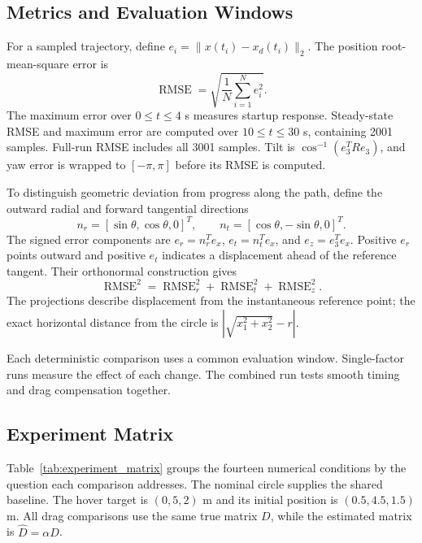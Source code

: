 \documentclass[letterpaper,10pt,conference]{ieeeconf}
\newcommand{\RMSE}{\operatorname{RMSE}}
\begin{document}
\subsection{Metrics and Evaluation Windows}
For a sampled trajectory, define $e_i=\|x(t_i)-x_d(t_i)\|_2$. The position root-mean-square error is
\begin{equation}
\RMSE=\sqrt{\frac1N\sum_{i=1}^N e_i^2}.
\end{equation}
The maximum error over $0\le t\le4$ s measures startup response. Steady-state RMSE and maximum error are computed over $10\le t\le30$ s, containing 2001 samples. Full-run RMSE includes all 3001 samples. Tilt is $\cos^{-1}(e_3^TRe_3)$, and yaw error is wrapped to $[-\pi,\pi]$ before its RMSE is computed.

To distinguish geometric deviation from progress along the path, define the outward radial and forward tangential directions
\begin{equation}
n_r=[\sin\theta,\cos\theta,0]^T,\qquad
n_t=[\cos\theta,-\sin\theta,0]^T.
\end{equation}
The signed error components are $e_r=n_r^Te_x$, $e_t=n_t^Te_x$, and $e_z=e_3^Te_x$. Positive $e_r$ points outward and positive $e_t$ indicates a displacement ahead of the reference tangent. Their orthonormal construction gives
\begin{equation}
\RMSE^2=\RMSE_r^2+\RMSE_t^2+\RMSE_z^2.
\label{eq:components}
\end{equation}
The projections describe displacement from the instantaneous reference point; the exact horizontal distance from the circle is $|\sqrt{x_1^2+x_2^2}-r|$.

Each deterministic comparison uses a common evaluation window. Single-factor runs measure the effect of each change. The combined run tests smooth timing and drag compensation together.

\subsection{Experiment Matrix}
Table~\ref{tab:experiment_matrix} groups the fourteen numerical conditions by the question each comparison addresses. The nominal circle supplies the shared baseline. The hover target is $(0,5,2)$ m and its initial position is $(0.5,4.5,1.5)$ m. All drag comparisons use the same true matrix $D$, while the estimated matrix is $\widehat D=\alpha D$.
\end{document}
